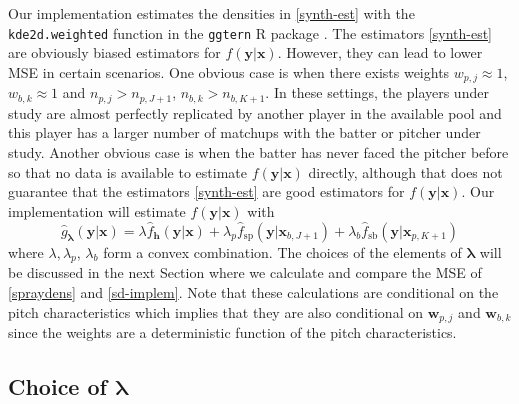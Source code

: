 \documentclass[11pt]{article}
\newcommand{\y}{\textbf{y}}
\newcommand{\x}{\textbf{x}}
\newcommand{\h}{\textbf{h}}
\newcommand{\w}{\textbf{w}}
\newcommand{\wstar}{w^{\textstyle{*}}}
\newcommand{\lambdabf}{\boldsymbol{\lambda}}
\begin{document}

Our implementation estimates the densities in \eqref{synth-est} with the \texttt{kde2d.weighted} function in the \texttt{ggtern} R package \citep{ggtern}. The estimators \eqref{synth-est} are obviously biased estimators for $f(\y|\x)$. However, they can lead to lower MSE in certain scenarios. One obvious case is when there exists weights $w_{p,j} \approx 1$, $w_{b,k} \approx 1$  and $n_{p,j} > n_{p,J+1}$, $n_{b,k} > n_{b,K+1}$. In these settings, the players under study are almost perfectly replicated by another player in the available pool and this player has a larger number of matchups with the batter or pitcher under study. Another obvious case is when the batter has never faced the pitcher before so that no data is available to estimate $f(\y|\x)$ directly, although that does not guarantee that the estimators \eqref{synth-est} are good estimators for $f(\y|\x)$. Our implementation will estimate $f(\y|\x)$ with
\begin{equation} \label{sd-implem}
  \hat{g}_{\lambdabf}(\y|\x) = \lambda \hat f_\h(\y|\x) 
    + \lambda_p \hat f_{\text{sp}}(\y|\x_{b,J+1}) 
    + \lambda_b \hat f_{\text{sb}}(\y|\x_{p,K+1})
\end{equation}
where $\lambda,\lambda_p$, $\lambda_b$ form a convex combination. The choices of the elements of $\lambdabf$ will be discussed in the next Section where we calculate and compare the MSE of \eqref{spraydens} and \eqref{sd-implem}. Note that these calculations are conditional on the pitch characteristics which implies that they are also conditional on $\w_{p,j}$ and $\w_{b,k}$ since the weights are a deterministic function of the pitch characteristics.



\subsection{Choice of $\lambdabf$}
\end{document}
